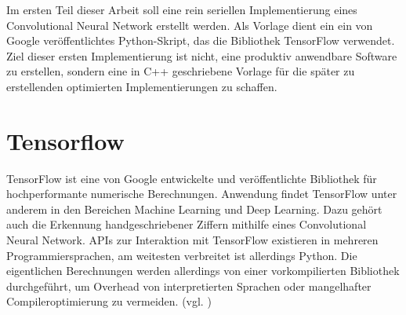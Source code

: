 \documentclass[../main.tex]{subfiles}
\begin{document}
Im ersten Teil dieser Arbeit soll eine rein seriellen Implementierung eines Convolutional Neural Network erstellt werden. Als Vorlage dient ein ein von Google veröffentlichtes Python-Skript, das die Bibliothek TensorFlow verwendet. Ziel dieser ersten Implementierung ist nicht, eine produktiv anwendbare Software zu erstellen, sondern eine in C++ geschriebene Vorlage für die später zu erstellenden optimierten Implementierungen zu schaffen. 

\section{Tensorflow}
TensorFlow ist eine von Google entwickelte und veröffentlichte Bibliothek für hochperformante numerische Berechnungen. Anwendung findet TensorFlow unter anderem in den Bereichen Machine Learning und Deep Learning. Dazu gehört auch die Erkennung handgeschriebener Ziffern mithilfe eines Convolutional Neural Network. APIs zur Interaktion mit TensorFlow existieren in mehreren Programmiersprachen, am weitesten verbreitet ist allerdings Python. Die eigentlichen Berechnungen werden allerdings von einer vorkompilierten Bibliothek durchgeführt, um Overhead von interpretierten Sprachen oder mangelhafter Compileroptimierung zu vermeiden. (vgl. \cite{tensorflowTutorial2})
\end{document}
